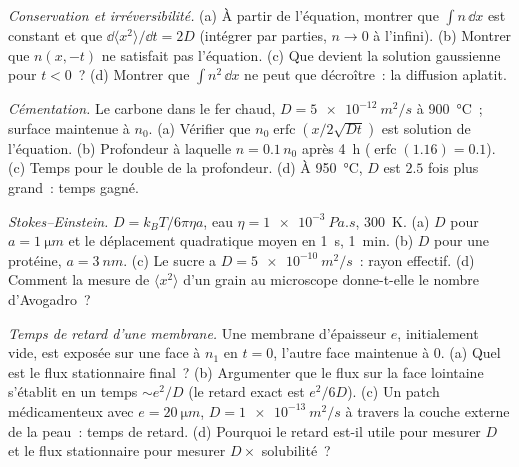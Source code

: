\begin{exercise}[$\star\star$]\label{exo:b2:particle-diffusion:7}
\emph{Conservation et irréversibilité.} (a) À partir de l'équation, montrer
que $\int n\,\dd x$ est constant et que $\dd\langle x^2\rangle/\dd t =
2D$ (intégrer par parties, $n \to 0$ à l'infini). (b) Montrer que
$n(x,-t)$ ne satisfait pas l'équation. (c) Que devient la
solution gaussienne pour $t < 0$~? (d) Montrer que $\int n^2\,\dd x$ ne peut que
décroître~: la diffusion aplatit.
\end{exercise}

\begin{exercise}[$\star\star$]\label{exo:b2:particle-diffusion:8}
\emph{Cémentation.} Le carbone dans le fer chaud, $D = \qty{5e-12}{m^2/s}$ à
\qty{900}{\celsius}~; surface maintenue à $n_0$. (a) Vérifier que $n_0
\operatorname{erfc}(x/2\sqrt{Dt})$ est solution de l'équation. (b) Profondeur à
laquelle $n = 0.1\,n_0$ après \qty{4}{h} ($\operatorname{erfc}(1.16) = 0.1$).
(c) Temps pour le double de la profondeur. (d) À \qty{950}{\celsius}, $D$ est $2.5$
fois plus grand~: temps gagné.
\end{exercise}

\begin{exercise}[$\star\star$]\label{exo:b2:particle-diffusion:9}
\emph{Stokes--Einstein.} $D = k_BT/6\pi\eta a$, eau $\eta =
\qty{1e-3}{Pa.s}$, \qty{300}{K}. (a) $D$ pour $a = \qty{1}{\micro m}$ et le
déplacement quadratique moyen en \qty{1}{s}, \qty{1}{min}. (b) $D$
pour une protéine, $a = \qty{3}{nm}$. (c) Le sucre a $D = \qty{5e-10}{m^2/s}$~:
rayon effectif. (d) Comment la mesure de $\langle x^2\rangle$ d'un grain
au microscope donne-t-elle le nombre d'Avogadro~?
\end{exercise}

\begin{exercise}[$\star\star\star$]\label{exo:b2:particle-diffusion:10}
\emph{Temps de retard d'une membrane.} Une membrane d'épaisseur $e$, initialement
vide, est exposée sur une face à $n_1$ en $t = 0$, l'autre face maintenue
à $0$. (a) Quel est le flux stationnaire final~? (b) Argumenter que le flux
sur la face lointaine s'établit en un temps $\sim e^2/D$ (le retard exact est
$e^2/6D$). (c) Un patch médicamenteux avec $e = \qty{20}{\micro m}$, $D =
\qty{1e-13}{m^2/s}$ à travers la couche externe de la peau~: temps de retard. (d) Pourquoi
le retard est-il utile pour mesurer $D$ et le flux stationnaire pour mesurer
$D \times$ solubilité~?
\end{exercise}

